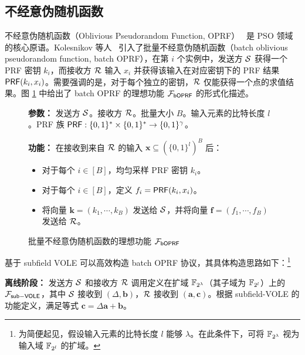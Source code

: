 \subsection{不经意伪随机函数}\label{sec:boprf}

不经意伪随机函数（Oblivious Pseudorandom Function, OPRF）~\cite{FIPR-TCC-2005,CM-CRYPTO-2020,RS-EUROCRYPT-2021} 是 PSO 领域的核心原语。Kolesnikov 等人~\cite{KKRT-CCS-2016} 引入了批量不经意伪随机函数（batch oblivious pseudorandom function, batch OPRF），在第 $i$ 个实例中，发送方 $\mathcal{S}$ 获得一个 PRF 密钥 $k_i$，而接收方 $\mathcal{R}$ 输入 $x_i$ 并获得该输入在对应密钥下的 PRF 结果 $\mathsf{PRF}(k_i, x_i)$。需要强调的是，对于每个独立的密钥，$\mathcal{R}$ 仅能获得一个点的求值结果。图 \ref{fig:func-boprf} 中给出了 batch OPRF 的理想功能 $\mathcal{F}_\mathsf{bOPRF}$ 的形式化描述。

\begin{figure}[!htb]
\begin{framed}
\begin{minipage}[center]{\textwidth}
\begin{trivlist}
\item \textbf{参数：} 发送方 $\mathcal{S}$。接收方 $\mathcal{R}$。批量大小 $B$。输入元素的比特长度 $l$。PRF 族 $\mathsf{PRF}: \{0,1\}^* \times \{0,1\}^* \to \{0,1\}^{\gamma}$。
\item \textbf{功能：} 在接收到来自 $\mathcal{R}$ 的输入 $\textbf{x} \subseteq (\{0,1\}^l)^B$ 后：
\begin{itemize}[itemsep=2pt,topsep=0pt,parsep=0pt,leftmargin=10pt]
\item 对于每个 $i \in [B]$，均匀采样 PRF 密钥 $k_i$。
\item 对于每个 $i \in [B]$，定义 $f_i = \mathsf{PRF}(k_i,x_i)$。
\item 将向量 $\textbf{k} = (k_1, \cdots, k_B)$ 发送给 $\mathcal{S}$，并将向量 $\textbf{f} = (f_1, \cdots, f_B)$ 发送给 $\mathcal{R}$。
\end{itemize}
\end{trivlist}
\end{minipage}
\end{framed}
\caption{批量不经意伪随机函数的理想功能 $\mathcal{F}_\mathsf{bOPRF}$}\label{fig:func-boprf}
\end{figure}

基于 subfield VOLE 可以高效构造 batch OPRF 协议，其具体构造思路如下：\footnote{为简便起见，假设输入元素的比特长度 $l$ 能够 $\lambda$。在此条件下，可将 $\mathbb{F}_{2^{\lambda}}$ 视为输入域 $\mathbb{F}_{2^{l}}$ 的扩域。}

\noindent \textbf{离线阶段：} 发送方 $\mathcal{S}$ 和接收方 $\mathcal{R}$ 调用定义在扩域 $\mathbb{F}_{2^{\lambda}}$（其子域为 $\mathbb{F}_{2^{l}}$）上的 $\mathcal{F}_\mathsf{sub\mathsf{-}VOLE}$，其中 $\mathcal{S}$ 接收到 $(\Delta, \textbf{b})$，$\mathcal{R}$ 接收到 $(\textbf{a}, \textbf{c})$。根据 subfield-VOLE 的功能定义，满足等式 $\textbf{c} = \Delta \textbf{a} + \textbf{b}$。

